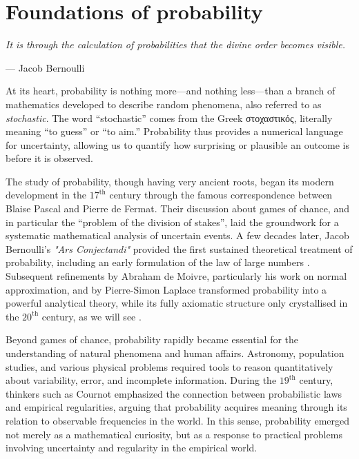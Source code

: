 \chapter{Foundations of probability}
\label{chapter2}

\epigraph{\textit{It is through the calculation of probabilities that the divine order becomes visible.}}{— Jacob Bernoulli}

At its heart, probability is nothing more—and nothing less—than a branch of mathematics developed to describe random phenomena, also referred to as \textit{stochastic}. The word ``stochastic'' comes from the Greek \textgreek{στοχαστικός}, literally meaning ``to guess'' or ``to aim.'' Probability thus provides a numerical language for uncertainty, allowing us to quantify how surprising or plausible an outcome is before it is observed.

\medskip

The study of probability, though having very ancient roots, began its modern development in the $17^{\text{th}}$ century through the famous correspondence between Blaise Pascal and Pierre de Fermat. Their discussion about games of chance, and in particular the ``problem of the division of stakes'', laid the groundwork for a systematic mathematical analysis of uncertain events. A few decades later, Jacob Bernoulli’s \textit{"Ars Conjectandi"} provided the first sustained theoretical treatment of probability, including an early formulation of the law of large numbers \cite{bernoulli_1713_ars,hald_1990_history}. Subsequent refinements by Abraham de Moivre, particularly his work on normal approximation, and by Pierre-Simon Laplace transformed probability into a powerful analytical theory, while its fully axiomatic structure only crystallised in the $20^{\text{th}}$ century, as we will see \cite{laplace_1812_theorie}.

\medskip

Beyond games of chance, probability rapidly became essential for the understanding of natural phenomena and human affairs. Astronomy, population studies, and various physical problems required tools to reason quantitatively about variability, error, and incomplete information. During the $19^{\text{th}}$ century, thinkers such as Cournot emphasized the connection between probabilistic laws and empirical regularities, arguing that probability acquires meaning through its relation to observable frequencies in the world. In this sense, probability emerged not merely as a mathematical curiosity, but as a response to practical problems involving uncertainty and regularity in the empirical world.

